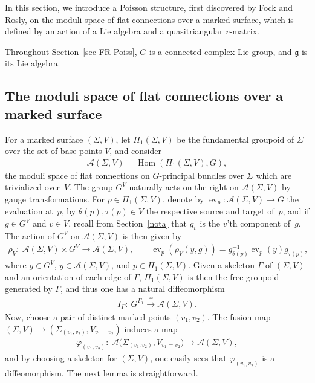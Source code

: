 \documentclass[10pt,a4paper]{amsart}
\numberwithin{equation}{section}
\def \g {\mathfrak{a}}
\def \g {\mathfrak{g}}
\def \A {{\mathcal{A}}}
\DeclareMathOperator{\Hom}{Hom}
\def \sV {{\scriptscriptstyle V}}
\begin{document}
In this section, we introduce a Poisson structure, f\/irst discovered by Fock and Rosly, on the moduli space of f\/lat connections over a marked surface, which is def\/ined by an action of a Lie algebra and a quasitriangular $r$-matrix.

Throughout Section~\ref{sec-FR-Poiss}, $G$ is a connected complex Lie group, and $\g$ is its Lie algebra.

\subsection{The moduli space of f\/lat connections over a marked surface} \label{subsec-moduli}

For a marked surface $(\Sigma, V)$, let $\Pi_1(\Sigma, V)$ be the fundamental groupoid of $\Sigma$ over the set of base points $V$, and consider
\begin{gather*}
\A(\Sigma, V) = \Hom(\Pi_1(\Sigma, V), G),
\end{gather*}
the moduli space of f\/lat connections on $G$-principal bundles over $\Sigma$ which are trivialized over~$V$. The group $G^V$ naturally acts on the right on $\A(\Sigma, V)$ by gauge transformations. For $p \in \Pi_1(\Sigma, V)$, denote by $\operatorname{ev}_p\colon \A(\Sigma, V) \to G$ the evaluation at~$p$, by $\theta(p), \tau(p) \in V$ the respective source and target of~$p$, and if $g \in G^V$ and $v \in V$, recall from Section~\ref{nota} that $g_v$ is the $v$'th component of~$g$. The action of $G^V$ on $\A(\Sigma, V)$ is then given by
\begin{gather}
\rho_{\sV}\colon \ \A(\Sigma, V) \times G^V \to \A(\Sigma, V), \qquad \operatorname{ev}_p(\rho_{\sV}(y, g)) = g_{\theta(p)}^{-1} \operatorname{ev}_p(y) g_{\tau(p)}, \label{lambda}
\end{gather}
where $g \in G^V$, $y \in \A(\Sigma, V)$, and $p \in \Pi_1(\Sigma, V)$. Given a skeleton $\Gamma$ of $(\Sigma, V)$ and an orientation of each edge of $\Gamma$, $\Pi_1(\Sigma, V)$ is then the free groupoid generated by $\Gamma$, and thus one has a natural dif\/feomorphism
\begin{gather}
I_{\Gamma}\colon \ G^{\Gamma_1} \stackrel{\cong}{\longrightarrow} \A(\Sigma, V). \label{orient-edge}
\end{gather}
Now, choose a pair of distinct marked points $(v_1, v_2)$. The fusion map $(\Sigma, V) \to (\Sigma_{(v_1, v_2)}, V_{v_1= v_2})$ induces a map
\begin{gather}
\varphi_{(v_1, v_2)}\colon \ \A\big(\Sigma_{(v_1, v_2)}, V_{v_1= v_2}\big) \longrightarrow \A(\Sigma, V), \label{varphi_v_1,v_2}
\end{gather}
and by choosing a skeleton for $(\Sigma, V)$, one easily sees that $\varphi_{(v_1, v_2)}$ is a dif\/feomorphism. The next lemma is straightforward.
\end{document}
